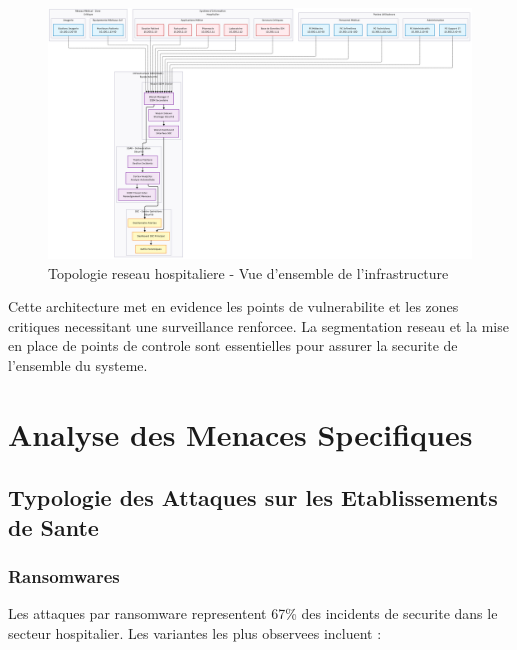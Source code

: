 \begin{figure}[H]
    \centering
    \includegraphics[width=\textwidth]{images/network_topology.png}
    \caption{Topologie reseau hospitaliere - Vue d'ensemble de l'infrastructure}
    \label{fig:network_topology}
\end{figure}

Cette architecture met en evidence les points de vulnerabilite et les zones critiques necessitant une surveillance renforcee. La segmentation reseau et la mise en place de points de controle sont essentielles pour assurer la securite de l'ensemble du systeme.

\section{Analyse des Menaces Specifiques}

\subsection{Typologie des Attaques sur les Etablissements de Sante}

\subsubsection{Ransomwares}

Les attaques par ransomware representent 67\% des incidents de securite dans le secteur hospitalier. Les variantes les plus observees incluent :

